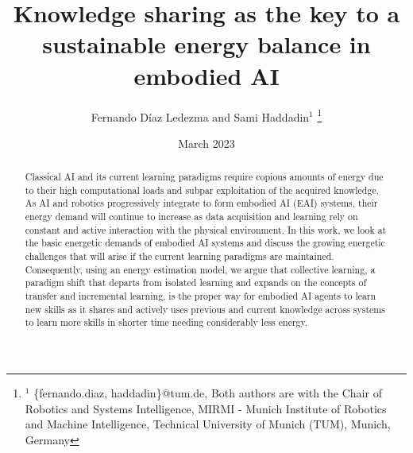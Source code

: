 \documentclass[a4, 10 pt, journal]{IEEEtran}
\begin{document}
\pagestyle{empty}
\title{Knowledge sharing as the key to a sustainable energy balance in embodied AI}

\author{Fernando D\'iaz Ledezma and Sami Haddadin$^{1}$%
\thanks{$^{1}$ {\small \{fernando.diaz, haddadin\}@tum.de}, 
Both authors are with the Chair of Robotics and Systems Intelligence, MIRMI - Munich Institute of Robotics and Machine Intelligence, Technical University of Munich (TUM), Munich, Germany}}
\date{March 2023}

\twocolumn[
  \begin{@twocolumnfalse}
    \maketitle
  \end{@twocolumnfalse}
]

 \begin{abstract}
Classical AI and its current learning paradigms require copious amounts of energy due to their high computational loads and subpar exploitation of the acquired knowledge. As AI and robotics progressively integrate to form embodied AI (EAI) systems, their energy demand will continue to increase as data acquisition and learning rely on constant and active interaction with the physical environment. In this work, we look at the basic energetic demands of embodied AI systems and discuss the growing energetic challenges that will arise if the current learning paradigms are maintained. Consequently, using an energy estimation model, we argue that collective learning, a paradigm shift that departs from isolated learning and expands on the concepts of transfer and incremental learning, is the proper way for embodied AI agents to learn new skills as it shares and actively uses previous and current knowledge across systems to learn more skills in shorter time needing considerably less energy.
 \end{abstract}

 
\end{document}
